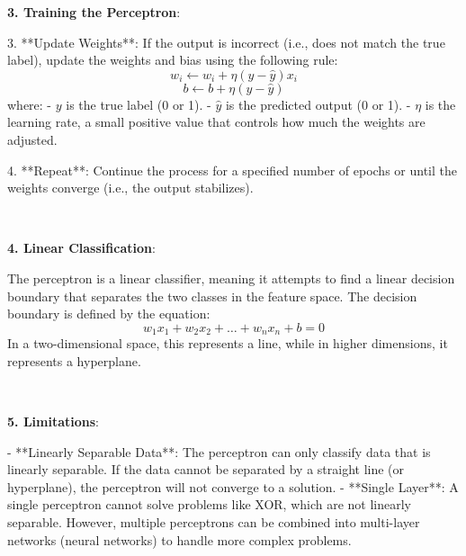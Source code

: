 \documentclass{article}
\newenvironment{cheatformula}[1][כותרת]{
    \begin{minipage}{\linewidth}
    \textbf{#1}:
}{
    \end{minipage}\\[0ex]
}
\begin{document}
\begin{multicols*}{2}
\begin{cheatformula}[3. Training the Perceptron]
3. **Update Weights**: If the output is incorrect (i.e., does not match the true label), update the weights and bias using the following rule:
   $$
   w_i \leftarrow w_i + \eta (y - \hat{y}) x_i
   $$
   $$
   b \leftarrow b + \eta (y - \hat{y})
   $$
   where:
   - $y$ is the true label (0 or 1).
   - $\hat{y}$ is the predicted output (0 or 1).
   - $\eta$ is the learning rate, a small positive value that controls how much the weights are adjusted.

4. **Repeat**: Continue the process for a specified number of epochs or until the weights converge (i.e., the output stabilizes).
\end{cheatformula}

\begin{cheatformula}[4. Linear Classification]
The perceptron is a linear classifier, meaning it attempts to find a linear decision boundary that separates the two classes in the feature space. The decision boundary is defined by the equation:
$$
w_1x_1 + w_2x_2 + \ldots + w_nx_n + b = 0
$$
In a two-dimensional space, this represents a line, while in higher dimensions, it represents a hyperplane.
\end{cheatformula}

\begin{cheatformula}[5. Limitations]

- **Linearly Separable Data**: The perceptron can only classify data that is linearly separable. If the data cannot be separated by a straight line (or hyperplane), the perceptron will not converge to a solution.
- **Single Layer**: A single perceptron cannot solve problems like XOR, which are not linearly separable. However, multiple perceptrons can be combined into multi-layer networks (neural networks) to handle more complex problems.
\end{cheatformula}



\end{multicols*}
\newpage
\end{document}
